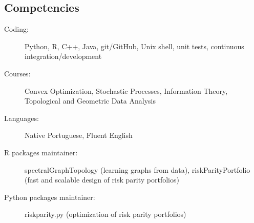 \documentclass[10pt]{article}
\begin{document}
\begin{titlepage}
\section*{Competencies}
\begin{description}
  \item[Coding:] \textsf{Python}, \textsf{R}, \textsf{C++}, \textsf{Java}, git/GitHub, Unix shell, unit tests, continuous integration/development
    \item[Courses:] Convex Optimization, Stochastic Processes, Information Theory, Topological and Geometric Data Analysis
    \item[Languages:] Native Portuguese, Fluent English
    \item[\textsf{R} packages maintainer:] \textsf{spectralGraphTopology} (learning graphs from data), \textsf{riskParityPortfolio} (fast and scalable design of risk parity portfolios)
    \item[\textsf{Python} packages maintainer:] \textsf{riskparity.py} (optimization of risk parity portfolios)
\end{description}

\end{titlepage}
\end{document}
